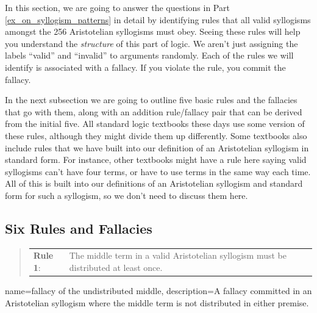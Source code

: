 In this section, we are going to answer the questions in Part \ref{ex_on_syllogism_patterns} in detail by identifying rules that all valid syllogisms amongst the 256 Aristotelian syllogisms must obey. Seeing these rules will help you understand the \emph{structure} of this part of logic. We aren't just  assigning the labels ``valid'' and ``invalid'' to arguments randomly. Each of the rules we will identify is associated with a fallacy. If you violate the rule, you commit the fallacy. 



In the next subsection we are going to outline five basic rules and the fallacies that go with them, along with an addition rule/fallacy pair that can be derived from the initial five. All standard logic textbooks these days use some version of these rules, although they might divide them up differently. Some textbooks also include rules that we have built into our definition of an Aristotelian syllogism in standard form. For instance, other textbooks might have a rule here saying valid syllogisms can't have four terms, or have to use terms in the same way each time. All of this is built into our definitions of an Aristotelian syllogism and standard form for such a syllogism, so we don't need to discuss them here. 

\subsection{Six Rules and Fallacies}
\begin{quotation}
\begin{longtabu}{p{.1\linewidth}p{.9\linewidth}}
\textbf{Rule 1}: & The middle term in a valid Aristotelian syllogism must be distributed at least once. 
\end{longtabu}
\end{quotation}

{
name=fallacy of the undistributed middle,
description={A fallacy committed in an Aristotelian syllogism where the middle term is not distributed in either premise.}
}

